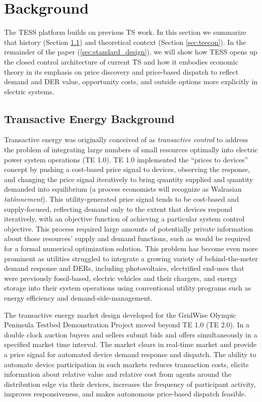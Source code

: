 \section{Background}\label{sec:background}

The TESS platform builds on previous TS work. In this section we summarize that history (Section \ref{sec:tehistory}) and theoretical context (Section \ref{sec:teecon}).
In the remainder of the paper (\cref{sec:standard_design}), we will show how TESS opens up the closed control architecture of current TS and how it embodies economic theory in its emphasis on price discovery and price-based dispatch to reflect demand and DER value, opportunity costs, and outside options more explicitly in electric systems.

\subsection{Transactive Energy Background}\label{sec:tehistory} 

Transactive energy was originally conceived of as \emph{transactive control} to address the problem of integrating large numbers of small resources optimally into electric power system operations (TE 1.0).
TE 1.0 implemented the ``prices to devices'' concept by pushing a cost-based price signal to devices, observing the response, and changing the price signal iteratively to bring quantity supplied and quantity demanded into equilibrium (a process economists will recognize as Walrasian \emph{tat\^{o}nnement}). This utility-generated price signal tends to be cost-based and supply-focused, reflecting demand only to the extent that devices respond iteratively, with an objective function of achieving a particular system control objective.
This process required large amounts of potentially private information about those resources' supply and demand functions, such as would be required for a formal numerical optimization solution.  This problem has become even more prominent as utilities struggled to integrate a growing variety of behind-the-meter demand response and DERs, including photovoltaics, electrified end-uses that were previously fossil-based, electric vehicles and their chargers, and energy storage into their system operations using conventional utility programs such as energy efficiency and demand-side-management. 

The transactive energy market design developed for the GridWise Olympic Peninsula Testbed Demonstration Project \citep{hammerstrom_2008} moved beyond TE 1.0 (TE 2.0). In a double clock auction buyers and sellers submit bids and offers simultaneously in a specified market time interval. 
The market clears in real-time market and provide a price signal for automated device demand response and dispatch.
The ability to automate device participation in such markets reduces transaction costs, elicits information about relative value and relative cost from agents around the distribution edge via their devices, increases the frequency of participant activity, improves responsiveness, and makes autonomous price-based dispatch feasible. 

